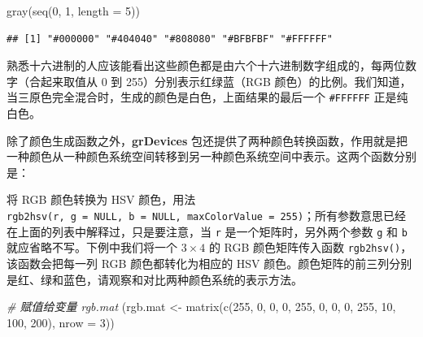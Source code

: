 \documentclass[
  b5paper,
  UTF8,twoside]{book}
\newenvironment{Shaded}{\begin{snugshade}}{\end{snugshade}}
\newcommand{\AttributeTok}[1]{\textcolor[rgb]{0.77,0.63,0.00}{#1}}
\newcommand{\CommentTok}[1]{\textcolor[rgb]{0.56,0.35,0.01}{\textit{#1}}}
\newcommand{\DecValTok}[1]{\textcolor[rgb]{0.00,0.00,0.81}{#1}}
\newcommand{\FunctionTok}[1]{\textcolor[rgb]{0.00,0.00,0.00}{#1}}
\newcommand{\NormalTok}[1]{#1}
\newcommand{\OtherTok}[1]{\textcolor[rgb]{0.56,0.35,0.01}{#1}}
\providecommand{\tightlist}{%
  \setlength{\itemsep}{0pt}\setlength{\parskip}{0pt}}
\begin{document}
\begin{Shaded}
\begin{Highlighting}[]
\FunctionTok{gray}\NormalTok{(}\FunctionTok{seq}\NormalTok{(}\DecValTok{0}\NormalTok{, }\DecValTok{1}\NormalTok{, }\AttributeTok{length =} \DecValTok{5}\NormalTok{))}
\end{Highlighting}
\end{Shaded}

\begin{verbatim}
## [1] "#000000" "#404040" "#808080" "#BFBFBF" "#FFFFFF"
\end{verbatim}

熟悉十六进制的人应该能看出这些颜色都是由六个十六进制数字组成的，每两位数字（合起来取值从 0 到 255）分别表示红绿蓝（RGB 颜色）的比例。我们知道，当三原色完全混合时，生成的颜色是白色，上面结果的最后一个 \texttt{\textquotesingle{}\#FFFFFF\textquotesingle{}} 正是纯白色。

除了颜色生成函数之外，\textbf{grDevices} 包还提供了两种颜色转换函数，作用就是把一种颜色从一种颜色系统空间转移到另一种颜色系统空间中表示。这两个函数分别是：

\begin{description}
\tightlist
\item[\texttt{rgb2hsv()}]
将 RGB 颜色转换为 HSV 颜色，用法 \texttt{rgb2hsv(r,\ g\ =\ NULL,\ b\ =\ NULL,\ maxColorValue\ =\ 255)}；所有参数意思已经在上面的列表中解释过，只是要注意，当 \texttt{r} 是一个矩阵时，另外两个参数 \texttt{g} 和 \texttt{b} 就应省略不写。下例中我们将一个 \(3\times4\) 的 RGB 颜色矩阵传入函数 \texttt{rgb2hsv()}，该函数会把每一列 RGB 颜色都转化为相应的 HSV 颜色。颜色矩阵的前三列分别是红、绿和蓝色，请观察和对比两种颜色系统的表示方法。
\end{description}

\begin{Shaded}
\begin{Highlighting}[]
\CommentTok{\# 赋值给变量 rgb.mat}
\NormalTok{(rgb.mat }\OtherTok{\textless{}{-}} \FunctionTok{matrix}\NormalTok{(}\FunctionTok{c}\NormalTok{(}\DecValTok{255}\NormalTok{, }\DecValTok{0}\NormalTok{, }\DecValTok{0}\NormalTok{, }\DecValTok{0}\NormalTok{, }\DecValTok{255}\NormalTok{, }\DecValTok{0}\NormalTok{, }\DecValTok{0}\NormalTok{, }\DecValTok{0}\NormalTok{, }\DecValTok{255}\NormalTok{, }\DecValTok{10}\NormalTok{, }\DecValTok{100}\NormalTok{, }\DecValTok{200}\NormalTok{), }\AttributeTok{nrow =} \DecValTok{3}\NormalTok{))}
\end{Highlighting}
\end{Shaded}
\end{document}
